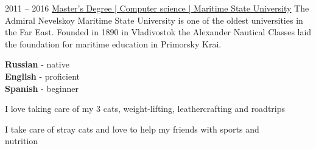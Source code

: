 \documentclass[9pt]{developercv} %
\begin{document}

\begin{entrylist}
	\entry
		{2011 -- 2016}
		{\href{https://www.msun.ru/en}{Master's Degree | Computer science | Maritime State University}}
		{ }
		{The Admiral Nevelskoy Maritime State University is one of the oldest universities in the Far East. Founded in 1890 in Vladivostok the Alexander Nautical Classes laid the foundation for maritime education in Primorsky Krai.}
\end{entrylist}


\begin{minipage}[t]{0.3\textwidth} %
	\vspace{-\baselineskip} %

	
	\textbf{Russian} - native\\
	\textbf{English} - proficient\\
	\textbf{Spanish} - beginner
\end{minipage}
\hfill %
\begin{minipage}[t]{0.3\textwidth} %
	\vspace{-\baselineskip} %
	
	
	I love taking care of my 3 cats, weight-lifting, leathercrafting and roadtrips
\end{minipage}
\hfill %
\begin{minipage}[t]{0.3\textwidth} %
	\vspace{-\baselineskip} %
	
	
	I take care of stray cats and love to help my friends with sports and \\nutrition
\end{minipage}

\end{document}
